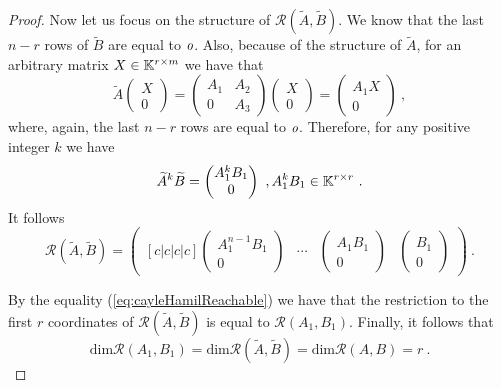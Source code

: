 \begin{proof}
	Now let us focus on the structure of $\mathcal{R}(\widetilde{A},\widetilde{B})$. We know that the last $n-r$ rows of $\widetilde{B}$ are equal to $\textit{o}$. Also, because of the structure of $\widetilde{A}$, for an arbitrary matrix $X\in\mathbb{K}^{r\times m}$ we have that 
	\begin{equation*}
		\widetilde{A}
		\begin{pmatrix}
			X \\
			0
		\end{pmatrix}
		=
		\begin{pmatrix}
			A_1 & A_2 \\
			  0 & A_3
		\end{pmatrix}
		\begin{pmatrix}
			X \\
			0
		\end{pmatrix}
		=
		\begin{pmatrix}
			A_1X \\
			0
		\end{pmatrix}\ ,
	\end{equation*}
	where, again, the last $n-r$ rows are equal to $\textit{o}$. Therefore, for any positive integer $k$ we have 
	\begin{equation*}
		\widetilde{A}^k\widetilde{B}=
		\begin{pmatrix}
			A_1^{k}B_1 \\
			0
        \end{pmatrix}
        \ ,A_1^kB_1\in\mathbb{K}^{r\times r}\ .
    \end{equation*}
    It follows
    \begin{equation*}
        \mathcal{R}(\widetilde{A},\widetilde{B})=
        \begin{pmatrix}[c|c|c|c]
            \begin{pmatrix}
                A_1^{n-1}B_1 \\
                0 
            \end{pmatrix}
            & \cdots &
            \begin{pmatrix}
                A_1B_1 \\
                0 
            \end{pmatrix}
            &
            \begin{pmatrix}
                B_1 \\
                0 
            \end{pmatrix}
        \end{pmatrix}\ .
    \end{equation*}
	
	By the equality (\ref{eq:cayleHamilReachable}) we have that the restriction to the first $r$ coordinates of $\mathcal{R}(\widetilde{A},\widetilde{B})$ is equal to $\mathcal{R}(A_1,B_1)$. Finally, it follows that
	$$\text{dim}\mathcal{R}(A_1,B_1)=\text{dim}\mathcal{R}(\widetilde{A},\widetilde{B})=\text{dim}\mathcal{R}(A,B)=r\ .$$
\end{proof}

